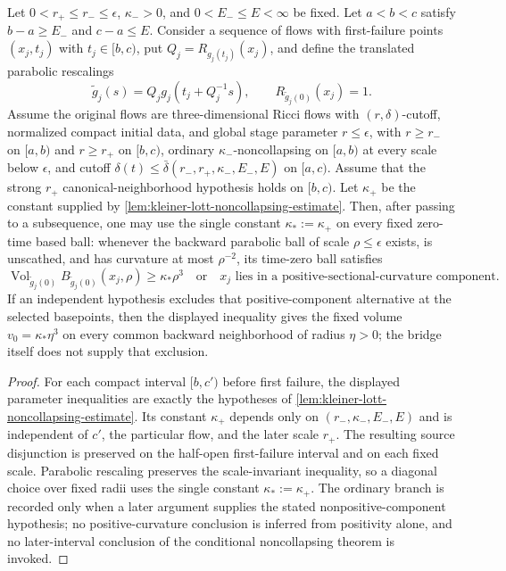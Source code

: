 \begin{lemma}
\label{lem:first-failure-noncollapsing-bridge}
\notready
Let $0<r_+\le r_-\le\epsilon$, $\kappa_->0$, and
$0<E_-\le E<\infty$ be fixed.  Let $a<b<c$ satisfy
$b-a\ge E_-$ and $c-a\le E$.  Consider a sequence of flows with
first-failure points $(x_j,t_j)$ with $t_j\in[b,c)$, put
$Q_j=R_{g_j(t_j)}(x_j)$, and define
the translated parabolic rescalings
\[
 \widetilde g_j(s)=Q_jg_j(t_j+Q_j^{-1}s),
 \qquad R_{\widetilde g_j(0)}(x_j)=1.
\]
Assume the original flows are three-dimensional Ricci flows with
$(r,\delta)$-cutoff, normalized compact initial data, and global stage
parameter $r\le\epsilon$, with $r\ge r_-$ on
$[a,b)$ and $r\ge r_+$ on $[b,c)$, ordinary $\kappa_-$-noncollapsing on
$[a,b)$ at every scale below $\epsilon$, and cutoff
$\delta(t)\le\bar\delta(r_-,r_+,\kappa_-,E_-,E)$ on $[a,c)$.  Assume that
the strong $r_+$ canonical-neighborhood hypothesis holds on $[b,c)$.  Let
$\kappa_+$ be the
constant supplied by
\ref{lem:kleiner-lott-noncollapsing-estimate}.  Then, after passing to a
subsequence, one may use the single constant $\kappa_*:=\kappa_+$ on every
fixed zero-time based ball: whenever the backward parabolic ball of scale
$\rho\le\epsilon$ exists, is unscathed, and has curvature at most
$\rho^{-2}$, its time-zero ball satisfies
\[
 \operatorname{Vol}_{\widetilde g_j(0)}
 B_{\widetilde g_j(0)}(x_j,\rho)
 \ge \kappa_*\rho^3
 \quad\text{or}\quad
 x_j\text{ lies in a positive-sectional-curvature component}.
\]
If an independent hypothesis excludes that positive-component alternative at
the selected basepoints, then the displayed inequality gives the fixed volume
$v_0=\kappa_*\eta^3$ on every common backward neighborhood of radius
$\eta>0$; the bridge itself does not supply that exclusion.
\end{lemma}

\begin{proof}
For each compact interval $[b,c')$ before first failure, the displayed
parameter inequalities are exactly the hypotheses of
\ref{lem:kleiner-lott-noncollapsing-estimate}.  Its constant
$\kappa_+$ depends only on $(r_-,\kappa_-,E_-,E)$ and is independent of
$c'$, the particular flow, and the later scale $r_+$.  The resulting source
disjunction is preserved on the half-open first-failure interval and on each
fixed scale.  Parabolic rescaling preserves the scale-invariant inequality, so
a diagonal choice over fixed radii uses the single constant
$\kappa_*:=\kappa_+$.  The ordinary branch is recorded only when a later
argument supplies the stated nonpositive-component hypothesis; no
positive-curvature conclusion is inferred from positivity alone, and no
later-interval conclusion of the conditional noncollapsing theorem is invoked.
\end{proof}

